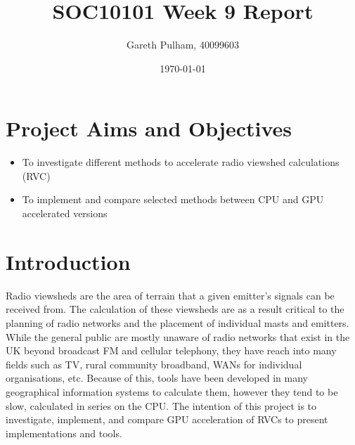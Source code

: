 \documentclass[a4paper]{article}
\begin{document}
    \begin{titlepage}
        \title{SOC10101 Week 9 Report}
        \author{Gareth Pulham, 40099603}
        \date{\today}
        \maketitle
        \thispagestyle{empty}
    \end{titlepage}

    \tableofcontents

    \section{Project Aims and Objectives}
    \begin{itemize}
        \item To investigate different methods to accelerate radio viewshed calculations (RVC)
        \item To implement and compare selected methods between CPU and GPU accelerated versions
    \end{itemize}

    \section{Introduction}
    Radio viewsheds are the area of terrain that a given emitter's signals can be received from. The calculation of
    these viewsheds are as a result critical to the planning of radio networks and the placement of individual masts
    and emitters. While the general public are mostly unaware of radio networks that exist in the UK beyond broadcast
    FM and cellular telephony, they have reach into many fields such as TV, rural community broadband, WANs for
    individual organisations, etc. Because of this, tools have been developed in many geographical information systems
    to calculate them, however they tend to be slow, calculated in series on the CPU. The intention of this project is
    to investigate, implement, and compare GPU acceleration of RVCs to present implementations and tools.
\end{document}

